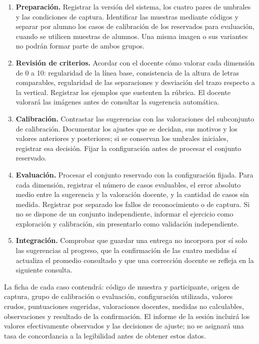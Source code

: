 \begin{enumerate}
    \item \textbf{Preparación.} Registrar la versión del sistema, los cuatro pares de umbrales y las condiciones de captura. Identificar las muestras mediante códigos y separar por alumno los casos de calibración de los reservados para evaluación, cuando se utilicen muestras de alumnos. Una misma imagen o sus variantes no podrán formar parte de ambos grupos.
    \item \textbf{Revisión de criterios.} Acordar con el docente cómo valorar cada dimensión de 0 a 10: regularidad de la línea base, consistencia de la altura de letras comparables, regularidad de las separaciones y desviación del trazo respecto a la vertical. Registrar los ejemplos que sustenten la rúbrica. El docente valorará las imágenes antes de consultar la sugerencia automática.
    \item \textbf{Calibración.} Contrastar las sugerencias con las valoraciones del subconjunto de calibración. Documentar los ajustes que se decidan, sus motivos y los valores anteriores y posteriores; si se conservan los umbrales iniciales, registrar esa decisión. Fijar la configuración antes de procesar el conjunto reservado.
    \item \textbf{Evaluación.} Procesar el conjunto reservado con la configuración fijada. Para cada dimensión, registrar el número de casos evaluables, el error absoluto medio entre la sugerencia y la valoración docente, y la cantidad de casos sin medida. Registrar por separado los fallos de reconocimiento o de captura. Si no se dispone de un conjunto independiente, informar el ejercicio como exploración y calibración, sin presentarlo como validación independiente.
    \item \textbf{Integración.} Comprobar que guardar una entrega no incorpora por sí solo las sugerencias al progreso, que la confirmación de las cuatro medidas sí actualiza el promedio consultado y que una corrección docente se refleja en la siguiente consulta.
\end{enumerate}

La ficha de cada caso contendrá: código de muestra y participante, origen de captura, grupo de calibración o evaluación, configuración utilizada, valores crudos, puntuaciones sugeridas, valoraciones docentes, medidas no calculables, observaciones y resultado de la confirmación. El informe de la sesión incluirá los valores efectivamente observados y las decisiones de ajuste; no se asignará una tasa de concordancia a la legibilidad antes de obtener estos datos.
